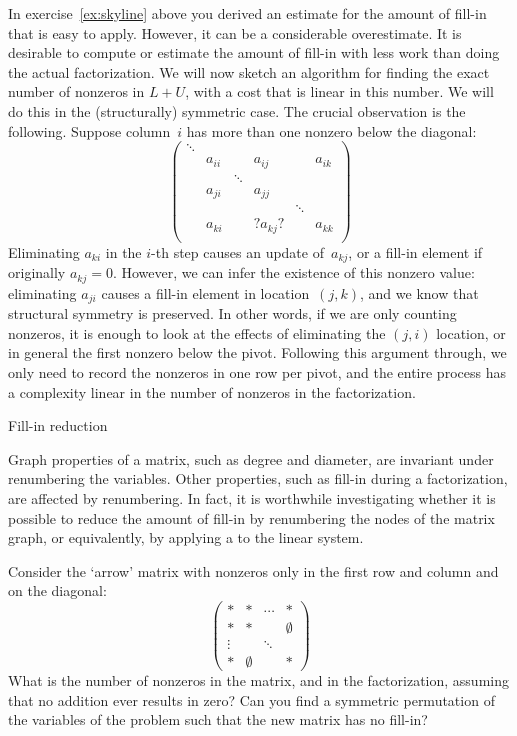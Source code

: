 In exercise~\ref{ex:skyline} above you derived an estimate for the
amount of fill-in that is easy to apply. However, it can be a
considerable overestimate. It is desirable to compute or estimate the
amount of fill-in with less work than doing the actual factorization.
We will now sketch an algorithm for finding the exact
number of nonzeros in $L+U$, with a cost that is linear in this
number. We will do this in the (structurally) symmetric case. The
crucial observation is the following. Suppose column~$i$ has more than
one nonzero below the diagonal:
\[
\begin{pmatrix}
  \ddots\\ &a_{ii}&&a_{ij}&&a_{ik}\\ 
  &&\ddots\\ &a_{ji}&&a_{jj}\\ &&&&\ddots\\
  &a_{ki}&&?a_{kj}?&&a_{kk}\\ 
\end{pmatrix}
\]
Eliminating $a_{ki}$ in the $i$-th step causes an update of~$a_{kj}$,
or a fill-in element if originally $a_{kj}=0$. However, we can infer
the existence of this nonzero value: eliminating $a_{ji}$ causes a
fill-in element in location~$(j,k)$, and we know that structural
symmetry is preserved. In other words, if we are only
counting nonzeros, it is enough to look at the effects of eliminating
the $(j,i)$ location, or in general the first nonzero below the
pivot. Following this argument through, we only need to record the
nonzeros in one row per pivot, and the entire process has a complexity
linear in the number of nonzeros in the factorization.


 {Fill-in reduction}
\label{sec:arrow-matrix}

Graph properties of a matrix, such as degree and diameter, are
invariant under renumbering the variables. Other properties, such as
fill-in during a factorization, are affected by renumbering.
In fact, it is worthwhile investigating whether it is possible
to reduce the amount of fill-in by renumbering the nodes of the matrix
graph, or equivalently,
by applying a
 to the linear system.

\begin{exercise}
  Consider the `arrow' matrix with nonzeros only 
  in the first row and column and on the diagonal:
  \[ 
  \begin{pmatrix}
    *&*&\cdots&*\\ *&*&&\emptyset\\ \vdots&&\ddots\\ *&\emptyset&&*
  \end{pmatrix}
  \]
  What is the number of nonzeros in the matrix, and in the
  factorization, assuming that no addition ever results in zero? Can
  you find a symmetric permutation of the variables of the problem
  such that the new matrix has no fill-in?
\end{exercise}

